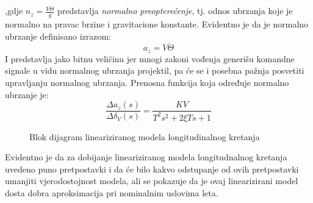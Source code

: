 ,gdje $n_z = \frac{V\dot{\Theta}}{g}$ predstavlja \textit{normalno preopterećenje}, tj. odnos ubrzanja koje je normalno na pravac brzine i gravitacione konstante. 
Evidentno je da je normalno ubrzanje definisano izrazom:
\begin{equation}
    a_z = V\dot{\Theta}
\end{equation}
I predstavlja jako bitnu veličinu jer mnogi zakoni vođenja generišu komandne signale u vidu normalnog ubrzanja projektil, pa će se i 
posebna pažnja posvetiti upravljanju normalnog ubrzanja. Prenosna funkcija koja određuje normalno ubrzanje je:
\begin{equation}
    \frac{\Delta a_z(s)}{\Delta \delta_V(s)} =\frac{KV}{T^2s^2+2\xi Ts+1}
\end{equation}
\begin{figure}[!ht]
    \centering
\caption{Blok dijagram lineariziranog modela longitudinalnog kretanja}
\label{fig:diagLongi}
\end{figure}
Evidentno je da za dobijanje lineariziranog modela longitudnalnog kretanja uvedeno 
puno pretpostavki i da će bilo kakvo odstupanje od ovih pretpostavki umanjiti vjerodostojnost modela, 
ali se pokazuje da je ovaj linearizirani model dosta dobra aproksimacija pri nominalnim uslovima leta. 

